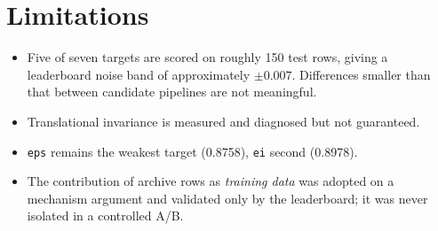 \documentclass[11pt,a4paper]{article}
\newcommand{\prop}[1]{\texttt{#1}}
\begin{document}
\section{Limitations}

\begin{itemize}[leftmargin=1.4em,itemsep=0.15em]
  \item Five of seven targets are scored on roughly 150 test rows, giving a
    leaderboard noise band of approximately $\pm0.007$. Differences smaller than
    that between candidate pipelines are not meaningful.
  \item Translational invariance is measured and diagnosed but not guaranteed.
  \item \prop{eps} remains the weakest target (0.8758), \prop{ei} second
    (0.8978).
  \item The contribution of archive rows as \emph{training data} was adopted on
    a mechanism argument and validated only by the leaderboard; it was never
    isolated in a controlled A/B.
\end{itemize}
\end{document}
